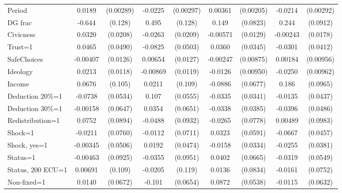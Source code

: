 \begin{tabular}{l|cccccc|cc}
Period          &   0.0189\sym{***}&(0.00289)&  -0.0225\sym{***}&(0.00297)&  0.00361\sym{*}  &(0.00205)&  -0.0214\sym{***}&(0.00292)\\
DG frac         &   -0.644\sym{***}&  (0.128)&    0.495\sym{***}&  (0.128)&    0.149\sym{*}  & (0.0823)&    0.244\sym{***}& (0.0912)\\
Civicness       &   0.0320         & (0.0208)&  -0.0263         & (0.0209)& -0.00571         & (0.0129)& -0.00243         & (0.0178)\\
Trust=1         &   0.0465         & (0.0490)&  -0.0825         & (0.0503)&   0.0360         & (0.0345)&  -0.0301         & (0.0412)\\
SafeChoices     & -0.00407         & (0.0126)&  0.00654         & (0.0127)& -0.00247         &(0.00875)&  0.00184         &(0.00956)\\
Ideology        &   0.0213\sym{*}  & (0.0118)& -0.00869         & (0.0119)&  -0.0126         &(0.00950)&  -0.0250\sym{**} &(0.00962)\\
Income          &   0.0676         &  (0.105)&   0.0211         &  (0.109)&  -0.0886         & (0.0677)&    0.186\sym{*}  & (0.0965)\\
Deduction 20\%=1&  -0.0738         & (0.0534)&    0.107\sym{*}  & (0.0555)&  -0.0335         & (0.0341)&  -0.0135         & (0.0437)\\
Deduction 30\%=1& -0.00158         & (0.0647)&   0.0354         & (0.0651)&  -0.0338         & (0.0385)&  -0.0396         & (0.0486)\\
Redistribution=1&   0.0752         & (0.0894)&  -0.0488         & (0.0932)&  -0.0265         & (0.0778)&  0.00489         & (0.0983)\\
Shock=1         &  -0.0211         & (0.0760)&  -0.0112         & (0.0711)&   0.0323         & (0.0591)&  -0.0667         & (0.0457)\\
Shock, yes=1    & -0.00345         & (0.0506)&   0.0192         & (0.0474)&  -0.0158         & (0.0334)&  -0.0255         & (0.0381)\\
Status=1        & -0.00463         & (0.0925)&  -0.0355         & (0.0951)&   0.0402         & (0.0665)&  -0.0319         & (0.0549)\\
Status, 200 ECU=1&  0.00691         &  (0.109)&  -0.0205         &  (0.119)&   0.0136         & (0.0834)&  -0.0161         & (0.0752)\\
Non-fixed=1     &   0.0140         & (0.0672)&   -0.101         & (0.0654)&   0.0872         & (0.0538)&  -0.0115         & (0.0632)\\

\end{tabular}
